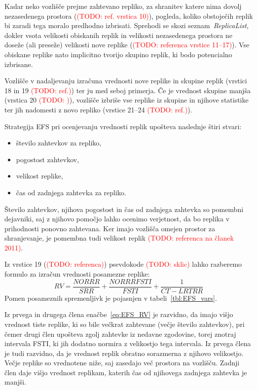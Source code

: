 \documentclass[a4paper, 12pt]{book}
\newcommand{\TODO}[1]{\textcolor{red}{(TODO: #1)}}
\begin{document}
Kadar neko vozlišče prejme zahtevano repliko, za shranitev katere nima dovolj
nezasedenega prostora (\TODO{ref. vrstica 10}), pogleda, koliko
obstoječih replik bi zaradi tega moralo predhodno izbrisati. Sprehodi se skozi
seznam~\textit{\mbox{ReplicaList}}, dokler vsota velikosti obiskanih replik in
velikosti nezasedenega prostora ne doseže (ali preseže) velikosti nove replike
(\TODO{referenca vrstice 11--17}). Vse obiskane replike nato implicitno
tvorijo skupino replik, ki bodo potencialno izbrisane.

Vozlišče v nadaljevanju izračuna vrednosti nove replike in skupine replik
(vrstici 18 in 19 \TODO{ref.}) ter ju med seboj primerja. Če je
vrednost skupine manjša (vrstica 20 \TODO{}), vozlišče izbriše vse replike
iz skupine in njihove statistike ter jih nadomesti z novo repliko
(vrstice 21--24 \TODO{ref.}).

Strategija EFS pri ocenjevanju vrednosti replik upošteva naslednje štiri
stvari:
\begin{itemize}
  \item število zahtevkov za repliko,
  \item pogostost zahtevkov,
  \item velikost replike,
  \item čas od zadnjega zahtevka za repliko.
\end{itemize}

Število zahtevkov, njihova pogostost in čas od zadnjega zahtevka so pomembni
dejavniki, saj z njihovo pomočjo lahko ocenimo verjetnost, da bo replika
v prihodnosti ponovno zahtevana. Ker imajo vozlišča omejen prostor za
shranjevanje, je pomembna tudi velikost replik
\TODO{referenca na članek 2011}.

\begin{samepage}
Iz vrstice 19 (\TODO{referenca}) psevdokode \TODO{sklic} lahko razberemo
formulo za izračun vrednosti posamezne replike:
\begin{equation}
  \mathit{RV} = \frac{\mathit{NORRR}}{\mathit{SRR}} +
                      \frac{\mathit{NORRRFSTI}}{\mathit{FSTI}} +
                      \frac{1}{\mathit{CT} - \mathit{LRTRR}}
  \label{eq:EFS_RV}
\end{equation}
Pomen posameznih spremenljivk je pojasnjen v tabeli~\ref{tbl:EFS_vars}.
\end{samepage}

Iz prvega in drugega člena enačbe~\eqref{eq:EFS_RV} je razvidno, da imajo
višjo vrednost tiste replike, ki so bile večkrat zahtevane (večje število
zahtevkov), pri čemer drugi člen upošteva zgolj zahtevke iz nedavne zgodovine,
torej znotraj intervala FSTI, ki jih dodatno normira z velikostjo tega
intervala. Iz prvega člena je tudi razvidno, da je vrednost replik obratno
sorazmerna z njihovo velikostjo. Večje replike so vrednotene niže, saj
zasedajo več prostora na vozlišču. Zadnji člen daje višjo vrednost replikam,
katerih čas od njihovega zadnjega zahtevka je manjši.
\end{document}
